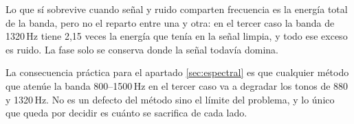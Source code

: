 Lo que sí sobrevive cuando señal y ruido comparten frecuencia es la energía
total de la banda, pero no el reparto entre una y otra: en el tercer caso la
banda de 1320\,Hz tiene 2,15 veces la energía que tenía en la señal limpia, y
todo ese exceso es ruido. La fase solo se conserva donde la señal todavía domina.

La consecuencia práctica para el apartado \ref{sec:espectral} es que cualquier
método que atenúe la banda 800--1500\,Hz en el tercer caso va a degradar los
tonos de 880 y 1320\,Hz. No es un defecto del método sino el límite del
problema, y lo único que queda por decidir es cuánto se sacrifica de cada lado.
